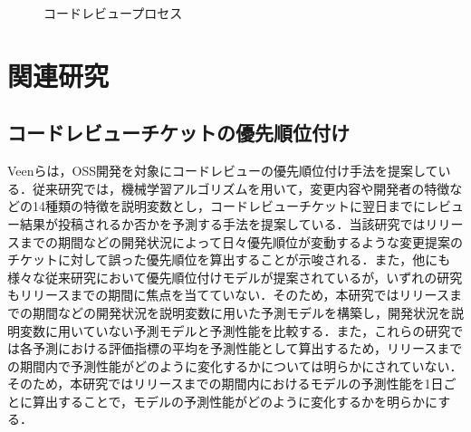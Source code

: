 \documentclass[submit]{ipsj}
\begin{document}
\begin{figure}[h]
\begin{center}
\caption{コードレビュープロセス}
\label{fig:codereviewprocess}
\end{center}
\end{figure}

\section{関連研究}
\subsection{コードレビューチケットの優先順位付け}
Veen\cite{prioritizer}らは，OSS開発を対象にコードレビューの優先順位付け手法を提案している．従来研究では，機械学習アルゴリズムを用いて，変更内容や開発者の特徴などの14種類の特徴を説明変数とし，コードレビューチケットに翌日までにレビュー結果が投稿されるか否かを予測する手法を提案している．当該研究ではリリースまでの期間などの開発状況によって日々優先順位が変動するような変更提案のチケットに対して誤った優先順位を算出することが示唆される．また，他にも様々な従来研究\cite{review_prioritize_pineapple}\cite{prioritize_azeem}\cite{prioritize_fan}において優先順位付けモデルが提案されているが，いずれの研究もリリースまでの期間に焦点を当てていない．そのため，本研究ではリリースまでの期間などの開発状況を説明変数に用いた予測モデルを構築し，開発状況を説明変数に用いていない予測モデルと予測性能を比較する．また，これらの研究\cite{prioritizer}\cite{review_prioritize_pineapple}\cite{prioritize_azeem}\cite{prioritize_fan}では各予測における評価指標の平均を予測性能として算出するため，リリースまでの期間内で予測性能がどのように変化するかについては明らかにされていない．そのため，本研究ではリリースまでの期間内におけるモデルの予測性能を1日ごとに算出することで，モデルの予測性能がどのように変化するかを明らかにする．
\end{document}

